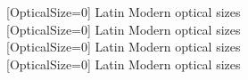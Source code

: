   [OpticalSize=0]
   Latin Modern optical sizes                \\
  [OpticalSize=0]
   Latin Modern optical sizes                \\
  [OpticalSize=0]
   Latin Modern optical sizes                \\
  [OpticalSize=0]
   Latin Modern optical sizes
